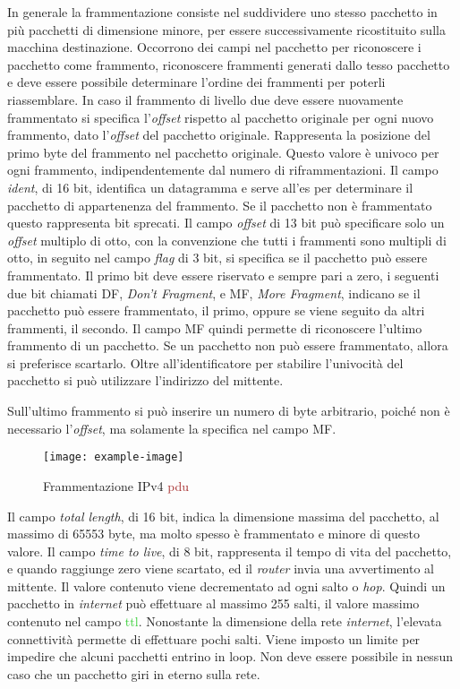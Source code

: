 \documentclass{article}
\numberwithin{equation}{subsection}
\begin{document}
In generale la frammentazione consiste nel suddividere uno stesso pacchetto in più pacchetti di dimensione minore, per essere successivamente ricostituito sulla macchina destinazione. 
Occorrono dei campi nel pacchetto per riconoscere i pacchetto come frammento, riconoscere frammenti generati dallo tesso pacchetto e deve essere possibile determinare 
l'ordine dei frammenti per poterli riassemblare. 
In caso il frammento di livello due deve essere nuovamente frammentato si specifica l'\textit{offset} rispetto al pacchetto originale per ogni nuovo frammento, dato l'\textit{offset} del pacchetto originale. Rappresenta la posizione del primo byte del frammento nel pacchetto originale. Questo valore è univoco per ogni frammento, indipendentemente dal numero di riframmentazioni. 
Il campo \textit{ident}, di 16 bit, identifica un datagramma e serve all'\textcolor{Periwinkle}{es} per determinare il pacchetto di appartenenza del frammento. Se il pacchetto non è frammentato questo rappresenta bit sprecati.  
Il campo \textit{offset} di 13 bit può specificare solo un \textit{offset} multiplo di otto, con la convenzione che tutti i frammenti sono multipli di otto, in seguito nel campo 
\textit{flag} di 3 bit, si specifica se il pacchetto può essere frammentato. Il primo bit deve essere riservato e sempre pari a zero, i seguenti due bit chiamati DF, \textit{Don't Fragment}, e MF, \textit{More Fragment}, indicano se il pacchetto può essere frammentato, il primo, oppure se viene seguito da altri frammenti, il secondo. Il campo MF quindi permette di riconoscere l'ultimo frammento di un pacchetto. 
Se un pacchetto non può essere frammentato, allora si preferisce scartarlo. 
Oltre all'identificatore per stabilire l'univocità del pacchetto si può utilizzare l'indirizzo del mittente. 

Sull'ultimo frammento si può inserire un numero di byte arbitrario, poiché non è necessario l'\textit{offset}, ma solamente la specifica nel campo MF. 

\begin{figure}[H]%
    \centering%
    \texttt{[image: example-image]}%
    \caption{Frammentazione \textcolor{BurntOrange}{IPv4} \textcolor{Brown}{pdu}}%
\end{figure}

Il campo \textit{total length}, di 16 bit, indica la dimensione massima del pacchetto, al massimo di 65553 byte, ma molto spesso è frammentato e minore di questo valore. 
Il campo \textit{time to live}, di 8 bit, rappresenta il tempo di vita del pacchetto, e quando raggiunge zero viene scartato, ed il \textit{router} invia una avvertimento al mittente. 
Il valore contenuto viene decrementato ad ogni salto o \textit{hop}. Quindi un pacchetto in \textit{internet} può effettuare al massimo 255 salti, il valore massimo contenuto nel campo \textcolor{LimeGreen}{ttl}. Nonostante la dimensione della rete 
\textit{internet}, l'elevata connettività permette di effettuare pochi salti. Viene imposto un limite per impedire che alcuni pacchetti entrino in loop. Non deve essere possibile 
in nessun caso che un pacchetto giri in eterno sulla rete. 
\end{document}
